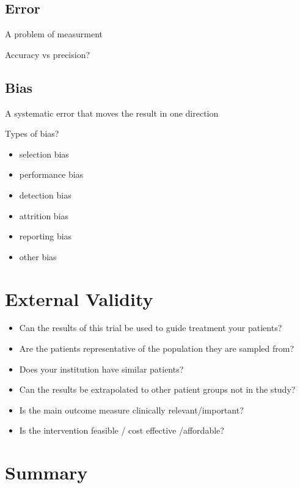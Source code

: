 \documentclass[
]{book}
\providecommand{\tightlist}{%
  \setlength{\itemsep}{0pt}\setlength{\parskip}{0pt}}
\theoremstyle{definition}
\theoremstyle{definition}
\theoremstyle{definition}
\theoremstyle{definition}
\theoremstyle{remark}
\begin{document}
\hypertarget{error}{%
\subsection{Error}\label{error}}

A problem of measurment

Accuracy vs precision?

\hypertarget{bias}{%
\subsection{Bias}\label{bias}}

A systematic error that moves the result in one direction

Types of bias?

\begin{itemize}
\tightlist
\item
  selection bias
\item
  performance bias
\item
  detection bias
\item
  attrition bias
\item
  reporting bias
\item
  other bias
\end{itemize}

\hypertarget{external-validity}{%
\section{External Validity}\label{external-validity}}

\begin{itemize}
\tightlist
\item
  Can the results of this trial be used to guide treatment your patients?
\item
  Are the patients representative of the population they are sampled from?
\item
  Does your institution have similar patients?
\item
  Can the results be extrapolated to other patient groups not in the study?
\item
  Is the main outcome measure clinically relevant/important?
\item
  Is the intervention feasible / cost effective /affordable?
\end{itemize}

\hypertarget{summary}{%
\section{Summary}\label{summary}}
\end{document}
